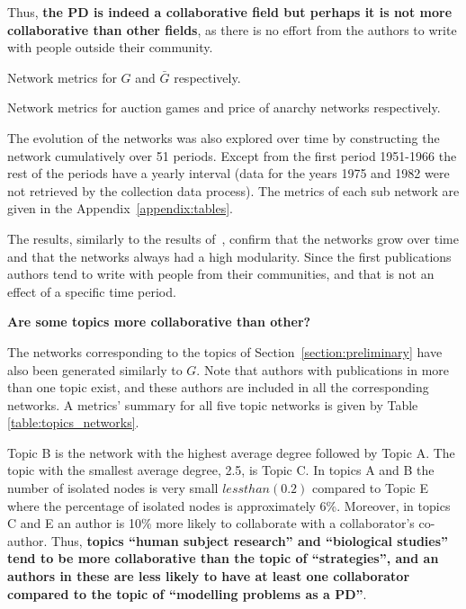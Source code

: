 Thus, \textbf{the PD is indeed a collaborative field but perhaps it is not
more collaborative than other fields}, as there is no effort from the authors
to write with people outside their community.

\begin{table}[!hbtp]
    \centering
    \resizebox{\textwidth}{!}{
    }
    \caption{Network metrics for \(G\) and \(\bar{G}\) respectively.}
    \label{table:network_comparison.tex}
\end{table}

\begin{table}[!hbtp]
    \centering
    \resizebox{\textwidth}{!}{
    }
    \caption{Network metrics for auction games and price of anarchy networks respectively.}
    \label{table:other_topics_network_comparison.tex}
\end{table}

The evolution of the networks was also explored over time by constructing the
network cumulatively over 51 periods. Except from the first period 1951-1966 the
rest of the periods have a yearly interval (data for the years 1975 and 1982
were not retrieved by the collection data process). The metrics of each sub
network are given in the Appendix~\ref{appendix:tables}.

The results, similarly to the results of~\cite{Liu2015}, confirm that the
networks grow over time and that the networks always had a high modularity.
Since the first publications authors tend to write with people from their
communities, and that is not an effect of a specific time period.

\textbf{Are some topics more collaborative than other?}

The networks corresponding to the topics of Section~\ref{section:preliminary} have
also been generated similarly to \(G\). Note that authors with publications in
more than one topic exist, and these authors are included in all the corresponding
networks. A metrics' summary for all five topic networks is given by Table
\ref{table:topics_networks}.

Topic B is the network with the highest average degree followed by Topic A. The
topic with the smallest average degree, 2.5, is Topic C. In topics A and B the
number of isolated nodes is very small \(less than (0.2)\) compared to Topic E where the
percentage of isolated nodes is approximately 6\%. Moreover, in topics C and E
an author is 10\% more likely to collaborate with a collaborator's co-author.
Thus, \textbf{topics ``human subject research'' and ``biological studies'' tend
to be more collaborative than the topic of ``strategies'', and an authors in
these are less likely to have at least one collaborator compared to the topic of
``modelling problems as a PD''}.

